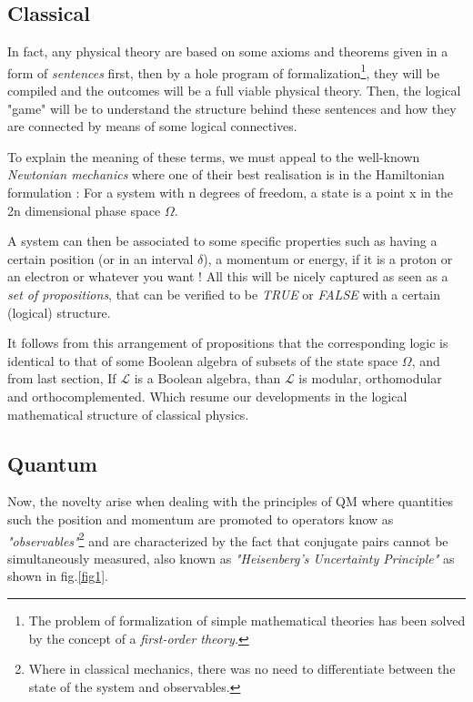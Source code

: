 \documentclass[12pt]{article}
\begin{document}
\subsection{Classical}

In fact, any physical theory are based on some axioms and theorems given in a form of \textit{sentences} first, then by a hole program of formalization\footnote{The problem of formalization of simple mathematical theories has been solved by the concept of a \textit{first-order theory.}\cite{1}}, they will be compiled and the outcomes will be a full viable physical theory. Then, the logical "game" will be to understand the structure behind these sentences and how they are connected by means of some logical connectives.

To explain the meaning of these terms, we must appeal to the well-known \textit{Newtonian mechanics} where one of their best realisation is in the Hamiltonian formulation : For a system with n degrees of freedom, a state is a point x in the 2n dimensional phase space $\Omega$.

A system can then be associated to some specific properties such as having a certain position (or in an interval $\delta$), a momentum or energy, if it is a proton or an electron or whatever you want ! All this will be nicely captured as seen as a \textit{set of propositions}, that can be verified to be \textit{TRUE} or \textit{FALSE} with a certain (logical) structure.

It follows from this arrangement of propositions that the corresponding logic is identical to that of some Boolean algebra of subsets of the state space $\Omega$, and from last section, If $\mathcal{L}$ is a Boolean algebra, than $\mathcal{L}$ is modular, orthomodular and orthocomplemented. Which resume our developments in the logical mathematical structure of classical physics.

\vspace{-0.4cm}
\subsection{Quantum}

Now, the novelty arise when dealing with the principles of QM where quantities such the position and momentum are promoted to operators know as \textit{"observables"}\footnote{Where in classical mechanics, there was no need to differentiate between the state of the system and observables.} and are characterized by the fact that conjugate pairs cannot be simultaneously measured, also known as \textit{"Heisenberg's Uncertainty Principle"} as shown in fig.\ref{fig1}.
\end{document}
